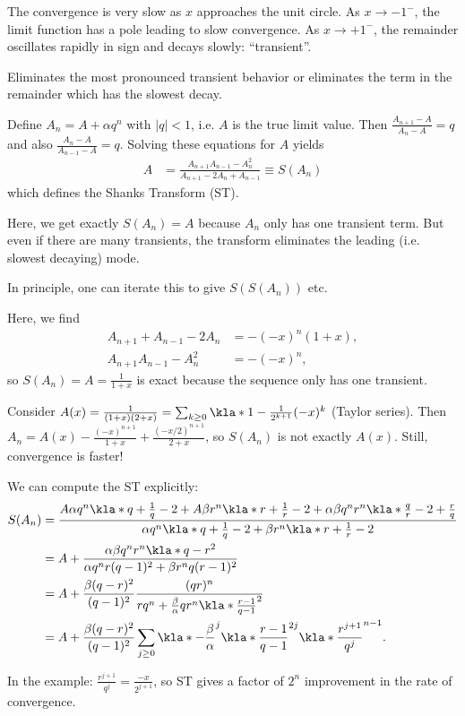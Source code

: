 \documentclass[english, parskip=full]{scrbook}
\newcommand{\definition}[2]{\begin{tcolorbox}[colback=colorbackgrounddefinition,colframe=colordefinition, breakable,enhanced,title=\textbf{#1}.]#2\end{tcolorbox}}
\newcommand{\note}[1]{\begin{tcolorbox}[colback=colorbackgroundnote,colframe=colornote, breakable,enhanced]#1\end{tcolorbox}}
\newcommand{\example}[3]{\begin{tcolorbox}[colback=colorbackgroundexample,colframe=colorexample, breakable,enhanced,title={\textbf{#1}: #2.}]#3\end{tcolorbox}}
\begin{document}
\example{Slowness from singularity}{$\sum (-x)^n=\frac{1}{1+x}$}{
The convergence is very slow as $x$ approaches the unit circle.
As $x\rightarrow -1^-$, the limit function has a pole leading to slow convergence.
As $x\rightarrow +1^-$, the remainder oscillates rapidly in sign and decays slowly: \enquote{transient}.
}
\definition{Shanks Transformation}{
Eliminates the most pronounced transient behavior or eliminates the term in the remainder which has the slowest decay.

Define $A_n=A+\alpha q^n$ with $|q|<1$, i.e. $A$ is the true limit value.
Then $\frac{A_{n+1}-A}{A_{n}-A} = q$ and also $\frac{A_{n}-A}{A_{n-1}-A} = q$.
Solving these equations for $A$ yields
\begin{align}
A &= \frac{A_{n+1} A_{n-1} - A_n^2}{A_{n+1} - 2A_n + A_{n-1}} \equiv S(A_n)
\end{align}
which defines the Shanks Transform (ST).
\note{
Here, we get exactly $S(A_n)=A$ because $A_n$ only has one transient term.
But even if there are many transients, the transform eliminates the leading (i.e. slowest decaying) mode.

In principle, one can iterate this to give $S(S(A_n))$ etc.
}
}
\example{An exact geometric series}{$A_n=\sum_{k=0}^n (-x)^k=\frac{1}{x+1} - \frac{(-x)^{n+1}}{1+x}$}{
Here, we find
\begin{align}
A_{n+1}+A_{n-1}-2A_n &= -(-x)^n (1+x),\\
A_{n+1}A_{n-1} - A_n^2 &= -(-x)^n,
\end{align}
so $S(A_n)=A=\frac{1}{1+x}$ is exact because the sequence only has one transient.
}
\example{Multiple transients}{$A_n=A+\alpha q^n + \beta r^n$}{
Consider $A(x)=\frac{1}{(1+x)(2+x)} = \sum_{k\ge 0} \kla*{1 - \frac{1}{2^{k+1}}}(-x)^k$ (Taylor series).
Then $A_n=A(x) - \frac{(-x)^{n+1}}{1+x} + \frac{(-x/2)^{n+1}}{2+x}$, so $S(A_n)$ is not exactly $A(x)$.
Still, convergence is faster!
\note{
We can compute the ST explicitly:
\begin{align}
S(A_n) &= \frac{A\alpha q^n \kla*{q + \frac{1}{q}-2} + A\beta r^n \kla*{r + \frac{1}{r} - 2} + \alpha \beta q^n r^n \kla*{\frac{q}{r} - 2 + \frac{r}{q}}}{\alpha q^n \kla*{q + \frac{1}{q}-2} + \beta r^n \kla*{r + \frac{1}{r} - 2}}\\
&= A + \frac{\alpha \beta q^n r^n \kla*{q-r}^2}{\alpha q^n r(q-1)^2 + \beta r^n q (r-1)^2}\\
&= A + \frac{\beta (q-r)^2}{(q-1)^2} \frac{(qr)^n}{rq^n + \frac{\beta}{\alpha} q r^n \kla*{\frac{r-1}{q-1}}^2}\\
&= A + \frac{\beta (q-r)^2}{(q-1)^2} \sum_{j\ge 0} \kla*{-\frac{\beta}{\alpha}}^j \kla*{\frac{r-1}{q-1}}^{2j} \kla*{\frac{r^{j+1}}{q^j}}^{n-1}.
\end{align}
}
In the example: $\frac{r^{j+1}}{q^j}=\frac{-x}{2^{j+1}}$, so ST gives a factor of $2^n$ improvement in the rate of convergence.
}
\end{document}
